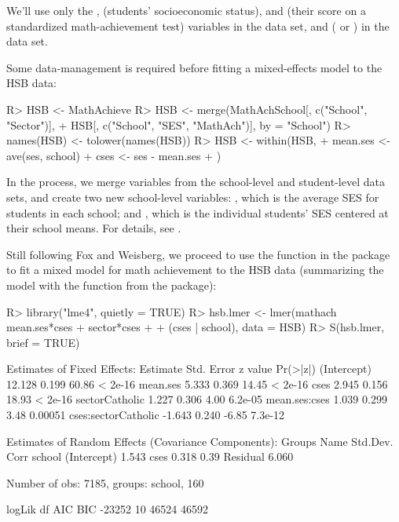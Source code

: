 \documentclass[
]{jss}
\begin{document}
We'll use only the ,  (students' socioeconomic
status), and  (their score on a standardized
math-achievement test) variables in the  data set, and
 ( or ) in the
 data set.

Some data-management is required before fitting a mixed-effects model to
the HSB data:

\begin{CodeChunk}
\begin{CodeInput}
R> HSB <- MathAchieve
R> HSB <- merge(MathAchSchool[, c("School", "Sector")],
+              HSB[, c("School", "SES", "MathAch")], by = "School")
R> names(HSB) <- tolower(names(HSB))
R> HSB <- within(HSB, {
+   mean.ses <- ave(ses, school)
+   cses <- ses - mean.ses
+ })
\end{CodeInput}
\end{CodeChunk}

In the process, we merge variables from the school-level and
student-level data sets, and create two new school-level variables:
, which is the average SES for students in each school;
and , which is the individual students' SES centered at their
school means. For details, see \citet[Sec.~7.2.2]{FoxWeisberg:2019}.

Still following Fox and Weisberg, we proceed to use the 
function in the  package \citep{BatesEtAl:2015} to fit a mixed
model for math achievement to the HSB data (summarizing the model with
the  function from the  package):

\begin{CodeChunk}
\begin{CodeInput}
R> library("lme4", quietly = TRUE)
R> hsb.lmer <- lmer(mathach ~ mean.ses*cses + sector*cses
+                    + (cses | school), data = HSB)
R> S(hsb.lmer, brief = TRUE)
\end{CodeInput}
\begin{CodeOutput}

Estimates of Fixed Effects:
                    Estimate Std. Error z value Pr(>|z|)
(Intercept)           12.128      0.199   60.86  < 2e-16
mean.ses               5.333      0.369   14.45  < 2e-16
cses                   2.945      0.156   18.93  < 2e-16
sectorCatholic         1.227      0.306    4.00  6.2e-05
mean.ses:cses          1.039      0.299    3.48  0.00051
cses:sectorCatholic   -1.643      0.240   -6.85  7.3e-12

Estimates of Random Effects (Covariance Components):
 Groups   Name        Std.Dev. Corr
 school   (Intercept) 1.543
          cses        0.318    0.39
 Residual             6.060

Number of obs: 7185, groups:  school, 160

logLik     df    AIC    BIC
-23252     10  46524  46592
\end{CodeOutput}
\end{CodeChunk}
\end{document}
